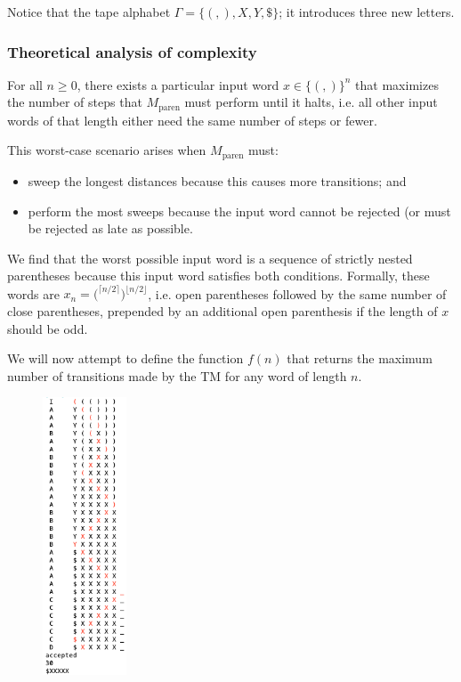 Notice that the tape alphabet $\Gamma=\{(,),X,Y,\$\}$; it introduces three new letters.

\subsubsection{Theoretical analysis of complexity}

For all $n\geq 0$, there exists a particular input word $x \in \{(,)\}^n$ that maximizes the number of steps that $M_\text{paren}$ must perform until it halts, i.e. all other input words of that length either need the same number of steps or fewer. 

This worst-case scenario arises when $M_\text{paren}$ must:

\begin{itemize}
    \item sweep the longest distances because this causes more transitions; and
    \item perform the most sweeps because the input word cannot be rejected (or must be rejected as late as possible.
\end{itemize}

We find that the worst possible input word is a sequence of strictly nested parentheses because this input word satisfies both conditions.
Formally, these words are
$x_n = \textbf{(}^{\lceil n/2 \rceil} \textbf{)}^{\lfloor n/2 \rfloor}$,
i.e. open parentheses followed by the same number of close parentheses, prepended by an additional open parenthesis if the length of $x$ should be odd. 

We will now attempt to define the function $f(n)$ that returns the maximum number of transitions made by the TM for any word of length $n$.

\begin{figure}
    \centering
    \includegraphics[width=2.5cm]{images/screenshots/paren.png}
    \vspace{-2cm}
\end{figure}

